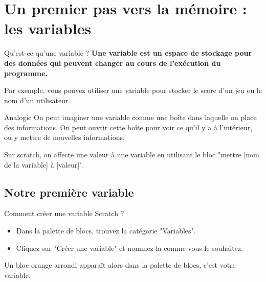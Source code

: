 

\section{Un premier pas vers la mémoire : les variables}
\begin{UPSTIinfor}{Qu'est-ce qu'une variable ?}
\vspace{1em}
\textbf{Une variable est un espace de stockage pour des données qui peuvent changer au cours de l'exécution du programme.} 

Par exemple, vous pouvez utiliser une variable pour stocker le score d'un jeu ou le nom d'un utilisateur.
\end{UPSTIinfor}

\begin{UPSTIidee}{Analogie}
    On peut imaginer une variable comme une boîte dans laquelle on place des informations. On peut ouvrir cette boîte pour voir ce qu'il y a à l'intérieur, ou y mettre de nouvelles informations.
\end{UPSTIidee}

Sur scratch, on affecte une valeur à une variable en utilisant le bloc "mettre [nom de la variable] à [valeur]".

\subsection{Notre première variable}
\begin{UPSTIManipulation}{Comment créer une variable Scratch ?}
    \begin{itemize}[label=$\square$]
        \item Dans la palette de blocs, trouvez la catégorie "Variables".
        \item Cliquez sur "Créer une variable" et nommez-la comme vous le souhaitez.   
    \end{itemize}
    Un bloc orange arrondi  apparaît alors dans la palette de blocs, c'est votre variable.
\end{UPSTIManipulation}


